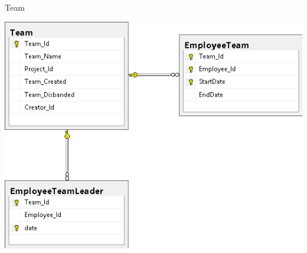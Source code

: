 \begin{frame}{Team}
  \begin{center}
    \includegraphics[height=0.9\textheight]{images/database/Team.png}
  \end{center}
\end{frame}